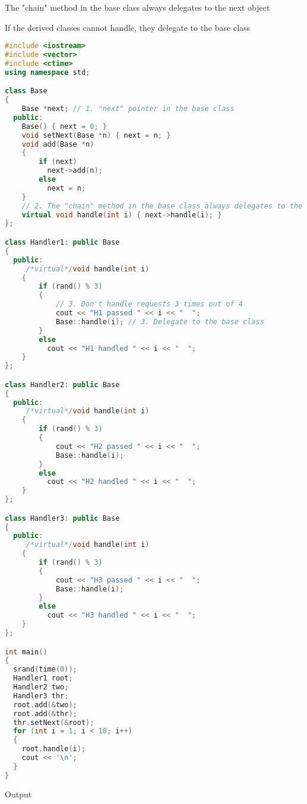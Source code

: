 \documentclass{book}
\begin{document}
    The "chain" method in the base class always delegates to the next object

    If the derived classes cannot handle, they delegate to the base class

\begin{lstlisting}[caption={sample code 1}, language=C++]
#include <iostream>
#include <vector>
#include <ctime>
using namespace std;

class Base
{
    Base *next; // 1. "next" pointer in the base class
  public:
    Base() { next = 0; }
    void setNext(Base *n) { next = n; }
    void add(Base *n)
    {
        if (next)
          next->add(n);
        else
          next = n;
    }
    // 2. The "chain" method in the base class always delegates to the next obj
    virtual void handle(int i) { next->handle(i); }
};

class Handler1: public Base
{
  public:
     /*virtual*/void handle(int i)
    {
        if (rand() % 3)
        {
            // 3. Don't handle requests 3 times out of 4
            cout << "H1 passed " << i << "  ";
            Base::handle(i); // 3. Delegate to the base class
        }
        else
          cout << "H1 handled " << i << "  ";
    }
};

class Handler2: public Base
{
  public:
     /*virtual*/void handle(int i)
    {
        if (rand() % 3)
        {
            cout << "H2 passed " << i << "  ";
            Base::handle(i);
        }
        else
          cout << "H2 handled " << i << "  ";
    }
};

class Handler3: public Base
{
  public:
     /*virtual*/void handle(int i)
    {
        if (rand() % 3)
        {
            cout << "H3 passed " << i << "  ";
            Base::handle(i);
        }
        else
          cout << "H3 handled " << i << "  ";
    }
};

int main()
{
  srand(time(0));
  Handler1 root;
  Handler2 two;
  Handler3 thr;
  root.add(&two);
  root.add(&thr);
  thr.setNext(&root);
  for (int i = 1; i < 10; i++)
  {
    root.handle(i);
    cout << '\n';
  }
}
\end{lstlisting}
Output
\end{document}
